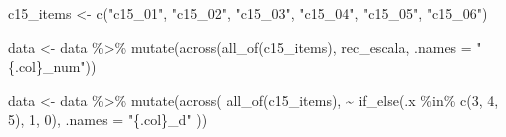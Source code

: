 \documentclass[
  letterpaper,
  DIV=11,
  numbers=noendperiod]{scrreprt}
\newenvironment{Shaded}{\begin{snugshade}}{\end{snugshade}}
\newcommand{\AttributeTok}[1]{\textcolor[rgb]{0.40,0.45,0.13}{#1}}
\newcommand{\DecValTok}[1]{\textcolor[rgb]{0.68,0.00,0.00}{#1}}
\newcommand{\FunctionTok}[1]{\textcolor[rgb]{0.28,0.35,0.67}{#1}}
\newcommand{\NormalTok}[1]{\textcolor[rgb]{0.00,0.23,0.31}{#1}}
\newcommand{\OtherTok}[1]{\textcolor[rgb]{0.00,0.23,0.31}{#1}}
\newcommand{\SpecialCharTok}[1]{\textcolor[rgb]{0.37,0.37,0.37}{#1}}
\newcommand{\StringTok}[1]{\textcolor[rgb]{0.13,0.47,0.30}{#1}}
\begin{document}
\begin{Shaded}
\begin{Highlighting}[]
\NormalTok{c15\_items }\OtherTok{\textless{}{-}} \FunctionTok{c}\NormalTok{(}\StringTok{"c15\_01"}\NormalTok{, }\StringTok{"c15\_02"}\NormalTok{, }\StringTok{"c15\_03"}\NormalTok{, }\StringTok{"c15\_04"}\NormalTok{, }\StringTok{"c15\_05"}\NormalTok{, }\StringTok{"c15\_06"}\NormalTok{)}

\NormalTok{data }\OtherTok{\textless{}{-}}\NormalTok{ data }\SpecialCharTok{\%\textgreater{}\%}
  \FunctionTok{mutate}\NormalTok{(}\FunctionTok{across}\NormalTok{(}\FunctionTok{all\_of}\NormalTok{(c15\_items), rec\_escala, }\AttributeTok{.names =} \StringTok{"\{.col\}\_num"}\NormalTok{))}

\NormalTok{data }\OtherTok{\textless{}{-}}\NormalTok{ data }\SpecialCharTok{\%\textgreater{}\%}
  \FunctionTok{mutate}\NormalTok{(}\FunctionTok{across}\NormalTok{(}
    \FunctionTok{all\_of}\NormalTok{(c15\_items),}
    \SpecialCharTok{\textasciitilde{}} \FunctionTok{if\_else}\NormalTok{(.x }\SpecialCharTok{\%in\%} \FunctionTok{c}\NormalTok{(}\DecValTok{3}\NormalTok{, }\DecValTok{4}\NormalTok{, }\DecValTok{5}\NormalTok{), }\DecValTok{1}\NormalTok{, }\DecValTok{0}\NormalTok{),}
    \AttributeTok{.names =} \StringTok{"\{.col\}\_d"}
\NormalTok{  ))}


\end{Highlighting}
\end{Shaded}
\end{document}
